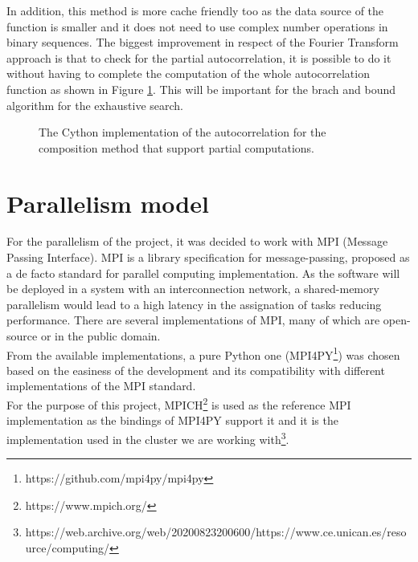       In addition, this method is more cache friendly too as the data source of
      the function is smaller and it does not need to use complex number
      operations in binary sequences. The biggest improvement in respect of the
      Fourier Transform approach is that to check for the partial autocorrelation,
      it is possible to do it without having to complete the computation of the
      whole autocorrelation function as shown in Figure
      \ref{composite_auto:fig:2}. This will be important for the brach and
      bound algorithm for the exhaustive search.\\


      \begin{figure}[ht!]
        \caption{The Cython implementation of the autocorrelation for the composition method that support partial computations.}
        \label{composite_auto:fig:2}
      \end{figure}


  \section{Parallelism model}

  For the parallelism of the project, it was decided to work with MPI (Message
  Passing Interface).  MPI is a library specification for message-passing, proposed
  as a de facto standard for parallel computing implementation. As the software
  will be deployed in a system with an interconnection network, a shared-memory
  parallelism would lead to a high latency in the assignation of tasks
  reducing performance. There are several implementations of MPI, many of which are
  open-source or in the public domain.\\

 From the available implementations, a pure
 Python one (MPI4PY\footnote{https://github.com/mpi4py/mpi4py}) was chosen based on
 the easiness of the development and its compatibility with different
 implementations of the MPI standard.\\

 For the purpose of this project, MPICH\footnote{https://www.mpich.org/} is used as
 the reference MPI implementation as the bindings of MPI4PY support it and it is
 the implementation used in the cluster we are working with\footnote{https://web.archive.org/web/20200823200600/https://www.ce.unican.es/resource/computing/}.\\

